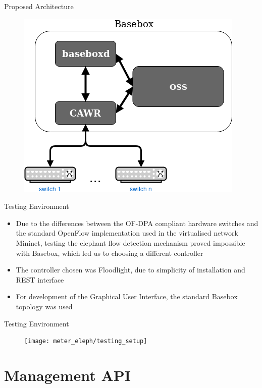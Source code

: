 \documentclass[aspectratio=43]{beamer}
\begin{document}
\begin{frame}{Proposed Architecture}
    \begin{figure}
        \includegraphics[width=.7\textwidth]{proposed_work/proposed_system}
    \end{figure}
\end{frame}

\begin{frame}{Testing Environment}
    \begin{itemize}
        \item Due to the differences between the OF-DPA compliant hardware switches and the standard OpenFlow implementation used in the virtualised 
            network Mininet, testing the elephant flow detection mechanism proved impossible with Basebox, which led us to choosing a different controller
            \pause 
        \item The controller chosen was Floodlight, due to simplicity of installation and REST interface
        \item For development of the Graphical User Interface, the standard Basebox topology was used
    \end{itemize}
\end{frame}

\begin{frame}{Testing Environment}
    \begin{figure}
        \texttt{[image: meter\_eleph/testing\_setup]}
    \end{figure}
\end{frame}

\section{Management API}
\end{document}
